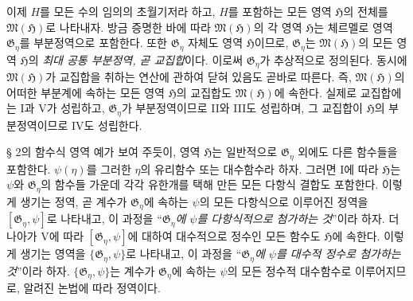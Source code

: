 이제 $H$를 모든 수의 임의의 초월기저라 하고, $H$를 포함하는 모든 영역 $\mathfrak H$의 전체를 $\mathfrak M(\mathfrak H)$로 나타내자. 방금 증명한 바에 따라 $\mathfrak M(\mathfrak H)$의 각 영역 $\mathfrak H$는 체르멜로 영역 $\mathfrak G_\eta$를 부분정역으로 포함한다. 또한 $\mathfrak G_\eta$ 자체도 영역 $\mathfrak H$이므로, $\mathfrak G_\eta$는 $\mathfrak M(\mathfrak H)$의 모든 영역 $\mathfrak H$의 \emph{최대 공통 부분정역, 곧 교집합}이다. 이로써 $\mathfrak G_\eta$가 추상적으로 정의된다. 동시에 $\mathfrak M(\mathfrak H)$가 교집합을 취하는 연산에 관하여 닫혀 있음도 곧바로 따른다. 즉, $\mathfrak M(\mathfrak H)$의 어떠한 부분계에 속하는 모든 영역 $\mathfrak H$의 교집합도 $\mathfrak M(\mathfrak H)$에 속한다. 실제로 교집합에는 I과 V가 성립하고, $\mathfrak G_\eta$가 부분정역이므로 II와 III도 성립하며, 그 교집합이 $\mathfrak H$의 부분정역이므로 IV도 성립한다.

§ 2의 함수식 영역 예가 보여 주듯이, 영역 $\mathfrak H$는 일반적으로 $\mathfrak G_\eta$ 외에도 다른 함수들을 포함한다. $\psi(\eta)$를 그러한 $\eta$의 유리함수 또는 대수함수라 하자. 그러면 I에 따라 $\mathfrak H$는 $\psi$와 $\mathfrak G_\eta$의 함수들 가운데 각각 유한개를 택해 만든 모든 다항식 결합도 포함한다. 이렇게 생기는 정역, 곧 계수가 $\mathfrak G_\eta$에 속하는 $\psi$의 모든 다항식으로 이루어진 정역을 $[\mathfrak G_\eta,\psi]$로 나타내고, 이 과정을 ``\emph{$\mathfrak G_\eta$에 $\psi$를 다항식적으로 첨가하는 것}''이라 하자. 더 나아가 V에 따라 $[\mathfrak G_\eta,\psi]$에 대하여 대수적으로 정수인 모든 함수도 $\mathfrak H$에 속한다. 이렇게 생기는 영역을 $\{\mathfrak G_\eta,\psi\}$로 나타내고, 이 과정을 ``\emph{$\mathfrak G_\eta$에 $\psi$를 대수적 정수로 첨가하는 것}''이라 하자. $\{\mathfrak G_\eta,\psi\}$는 계수가 $\mathfrak G_\eta$에 속하는 $\psi$의 모든 정수적 대수함수로 이루어지므로, 알려진 논법에 따라 정역이다.

